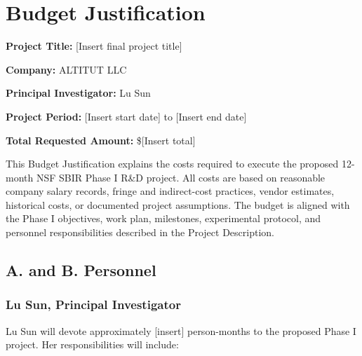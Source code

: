 \documentclass[11pt,letterpaper]{article}
\begin{document}
%

\section*{Budget Justification}

\noindent
\textbf{Project Title:} [Insert final project title]

\noindent
\textbf{Company:} ALTITUT LLC

\noindent
\textbf{Principal Investigator:} Lu Sun

\noindent
\textbf{Project Period:} [Insert start date] to [Insert end date]

\noindent
\textbf{Total Requested Amount:} \$[Insert total]

\medskip

This Budget Justification explains the costs required to execute the proposed
12-month NSF SBIR Phase I R\&D project. All costs are based on reasonable
company salary records, fringe and indirect-cost practices, vendor estimates,
historical costs, or documented project assumptions. The budget is aligned
with the Phase I objectives, work plan, milestones, experimental protocol, and
personnel responsibilities described in the Project Description.

\subsection*{A. and B. Personnel}

\subsubsection*{Lu Sun, Principal Investigator}

Lu Sun will devote approximately [insert] person-months to the proposed Phase
I project. Her responsibilities will include:
\end{document}

